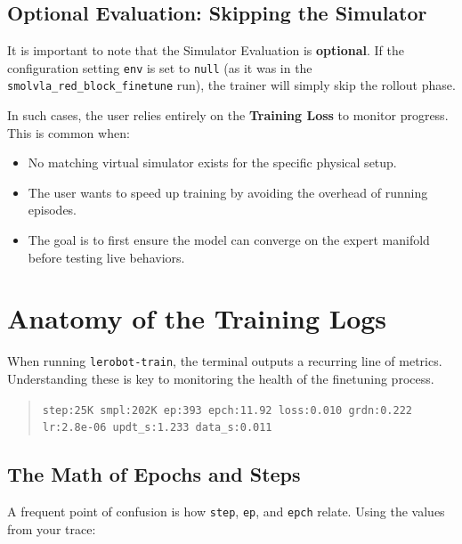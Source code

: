 \documentclass[11pt,a4paper]{article}
\begin{document}
\subsection{Optional Evaluation: Skipping the Simulator}
It is important to note that the Simulator Evaluation is \textbf{optional}. If the configuration setting \texttt{env} is set to \texttt{null} (as it was in the \texttt{smolvla\_red\_block\_finetune} run), the trainer will simply skip the rollout phase.

In such cases, the user relies entirely on the \textbf{Training Loss} to monitor progress. This is common when:
\begin{itemize}
    \item No matching virtual simulator exists for the specific physical setup.
    \item The user wants to speed up training by avoiding the overhead of running episodes.
    \item The goal is to first ensure the model can converge on the expert manifold before testing live behaviors.
\end{itemize}

\section{Anatomy of the Training Logs}
When running \texttt{lerobot-train}, the terminal outputs a recurring line of metrics. Understanding these is key to monitoring the health of the finetuning process.

\begin{quote}
\texttt{step:25K smpl:202K ep:393 epch:11.92 loss:0.010 grdn:0.222 lr:2.8e-06 updt\_s:1.233 data\_s:0.011}
\end{quote}

\subsection{The Math of Epochs and Steps}
A frequent point of confusion is how \texttt{step}, \texttt{ep}, and \texttt{epch} relate. Using the values from your trace:
\end{document}
